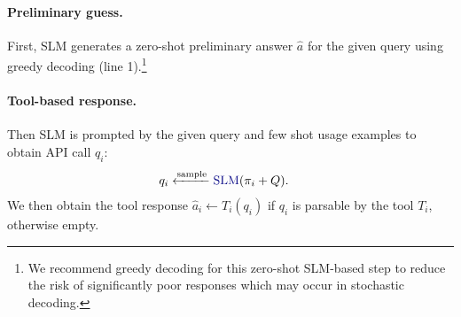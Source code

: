 \documentclass[11pt]{article}
\newcommand{\daniel}[1]{{\color{purple}[DK: #1]}}
\newcommand{\yining}[1]{{\color{ForestGreen}[YL: #1]}}
\newcommand{\yiningchange}[2]{{\color{ForestGreen}{\st{#1}}{#2}}}
\newcommand{\slm}{\textcolor{darkblueTwo}{SLM}}
\begin{document}
\paragraph{Preliminary guess.}
First, \slm{} generates a zero-shot preliminary answer $\hat{a}$ for the given query using greedy decoding (line 1).\footnote{We recommend greedy decoding for this zero-shot \slm-based step to reduce the risk of significantly poor responses which may occur in stochastic decoding. 
}

\paragraph{Tool-based response.}
Then \slm{} is prompted by the given query and few shot usage examples to obtain API call $q_i$: 
\begin{align*}
q_i &\sample \text{\slm}(\pi_i + Q).
\end{align*}
We then obtain the tool response $\hat{a}_i \leftarrow T_i(q_i)$ if $q_i$ is parsable by the tool $T_i$, otherwise empty. 

\end{document}
